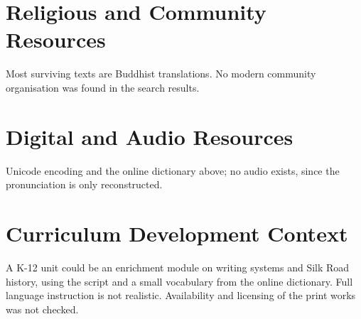 \documentclass[12pt]{article}
\begin{document}
\section{Religious and Community Resources}
Most surviving texts are Buddhist translations. No modern community organisation was found in the search results.

\section{Digital and Audio Resources}
Unicode encoding and the online dictionary above; no audio exists, since the pronunciation is only reconstructed.

\section{Curriculum Development Context}
A K-12 unit could be an enrichment module on writing systems and Silk Road history, using the script and a small vocabulary from the online dictionary. Full language instruction is not realistic. Availability and licensing of the print works was not checked.
\end{document}
